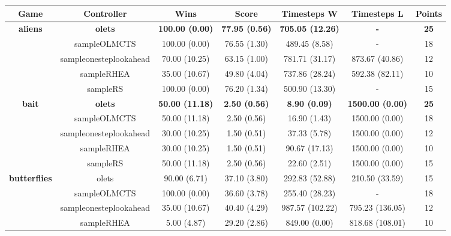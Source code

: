\begin{table*}[!t]
\begin{center}
\begin{adjustbox}{width=1\textwidth}\begin{tabular}{|c|c|c|c|c|c|c|}
\hline
\textbf{Game} & \textbf{Controller} & \textbf{Wins} &  \textbf{Score} & \textbf{Timesteps W} & \textbf{Timesteps L} & \textbf{Points}\\
\hline
\hline
\cline{2-7}
\multirow{5}{*}{\textbf{aliens}} & \textbf{olets} & \textbf{100.00 (0.00)} & \textbf{77.95 (0.56)} & \textbf{705.05 (12.26)} & \textbf{ - } & \textbf{25}
 \\
\cline{2-7}
 & sampleOLMCTS & 100.00 (0.00) & 76.55 (1.30) & 489.45 (8.58) &  -  & 18
 \\
\cline{2-7}
 & sampleonesteplookahead & 70.00 (10.25) & 63.15 (1.00) & 781.71 (31.17) & 873.67 (40.86) & 12
 \\
\cline{2-7}
 & sampleRHEA & 35.00 (10.67) & 49.80 (4.04) & 737.86 (28.24) & 592.38 (82.11) & 10
 \\
\cline{2-7}
 & sampleRS & 100.00 (0.00) & 76.20 (1.34) & 500.90 (13.30) &  -  & 15
 \\
\hline
\hline
\cline{2-7}
\multirow{5}{*}{\textbf{bait}} & \textbf{olets} & \textbf{50.00 (11.18)} & \textbf{2.50 (0.56)} & \textbf{8.90 (0.09)} & \textbf{1500.00 (0.00)} & \textbf{25}
 \\
\cline{2-7}
 & sampleOLMCTS & 50.00 (11.18) & 2.50 (0.56) & 16.90 (1.43) & 1500.00 (0.00) & 18
 \\
\cline{2-7}
 & sampleonesteplookahead & 30.00 (10.25) & 1.50 (0.51) & 37.33 (5.78) & 1500.00 (0.00) & 12
 \\
\cline{2-7}
 & sampleRHEA & 30.00 (10.25) & 1.50 (0.51) & 90.67 (17.13) & 1500.00 (0.00) & 10
 \\
\cline{2-7}
 & sampleRS & 50.00 (11.18) & 2.50 (0.56) & 22.60 (2.51) & 1500.00 (0.00) & 15
 \\
\hline
\hline
\cline{2-7}
\multirow{5}{*}{\textbf{butterflies}} & olets & 90.00 (6.71) & 37.10 (3.80) & 292.83 (52.88) & 210.50 (33.59) & 15
 \\
\cline{2-7}
 & sampleOLMCTS & 100.00 (0.00) & 36.60 (3.78) & 255.40 (28.23) &  -  & 18
 \\
\cline{2-7}
 & sampleonesteplookahead & 35.00 (10.67) & 40.40 (4.29) & 987.57 (102.22) & 795.23 (136.05) & 12
 \\
\cline{2-7}
 & sampleRHEA & 5.00 (4.87) & 29.20 (2.86) & 849.00 (0.00) & 818.68 (108.01) & 10
 \\

\end{tabular}
\end{adjustbox}
\end{center}
\end{table*}
